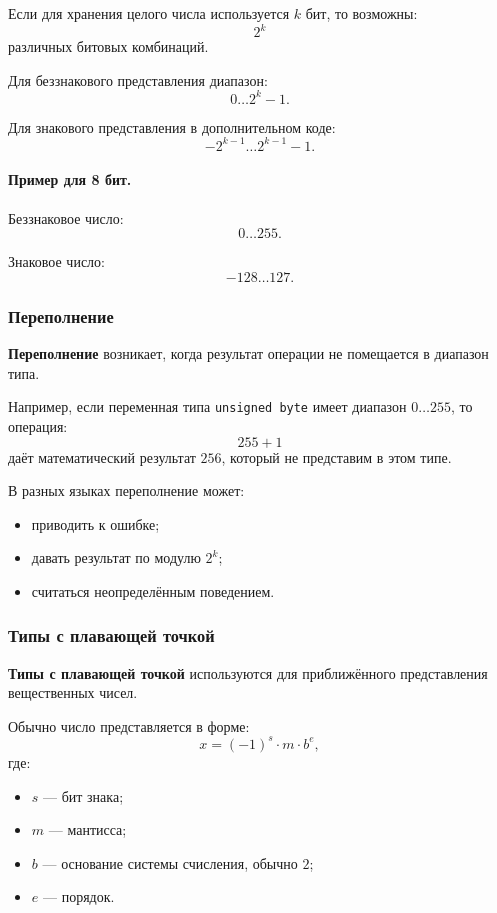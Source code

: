 \documentclass[12pt,a4paper]{article}
\begin{document}
Если для хранения целого числа используется $k$ бит, то возможны:
\[
    2^k
\]
различных битовых комбинаций.

Для беззнакового представления диапазон:
\[
    0 \dots 2^k - 1.
\]

Для знакового представления в дополнительном коде:
\[
    -2^{k-1} \dots 2^{k-1} - 1.
\]

\paragraph{Пример для 8 бит.}

Беззнаковое число:
\[
    0 \dots 255.
\]

Знаковое число:
\[
    -128 \dots 127.
\]

\subsubsection{Переполнение}

\textbf{Переполнение} возникает, когда результат операции не помещается в диапазон типа.

Например, если переменная типа \texttt{unsigned byte} имеет диапазон $0 \dots 255$, то операция:
\[
    255 + 1
\]
даёт математический результат $256$, который не представим в этом типе.

В разных языках переполнение может:
\begin{itemize}
    \item приводить к ошибке;
    \item давать результат по модулю $2^k$;
    \item считаться неопределённым поведением.
\end{itemize}

\subsubsection{Типы с плавающей точкой}

\textbf{Типы с плавающей точкой} используются для приближённого представления вещественных чисел.

Обычно число представляется в форме:
\[
    x = (-1)^s \cdot m \cdot b^e,
\]
где:
\begin{itemize}
    \item $s$ --- бит знака;
    \item $m$ --- мантисса;
    \item $b$ --- основание системы счисления, обычно $2$;
    \item $e$ --- порядок.
\end{itemize}
\end{document}
